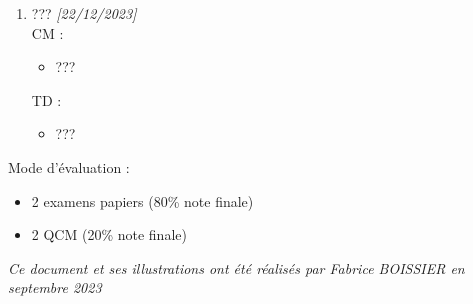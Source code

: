 \documentclass[11pt,a4paper]{article}
\begin{document}
\begin{enumerate}
\medskip

\item ??? \textit{[22/12/2023]}\\
  CM :
  \begin{itemize}
  \item ???
  \end{itemize}
  TD :
  \begin{itemize}
  \item ???
  \end{itemize}

\end{enumerate}

\bigskip

Mode d'évaluation :

\begin{itemize}
\item 2 examens papiers (80\% note finale)
\item 2 QCM (20\% note finale)
\end{itemize}




\bigskip

\vfillFirst

\vfillLast


\begin{center}
\textit{Ce document et ses illustrations ont été réalisés par Fabrice BOISSIER en septembre 2023}
\end{center}
\end{document}
